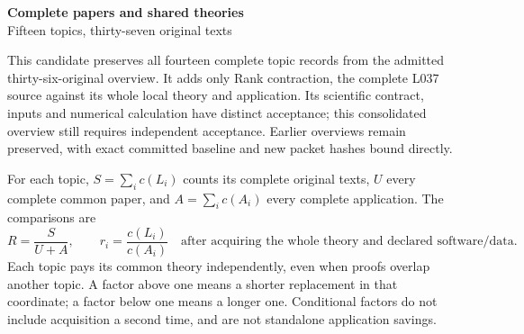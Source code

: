\documentclass[11pt,a4paper]{article}
\begin{document}
\begin{center}\Large\textbf{Complete papers and shared theories}\\[4pt]
\normalsize Fifteen topics, thirty-seven original texts\end{center}
This candidate preserves all fourteen complete topic records from the admitted thirty-six-original overview. It adds only Rank contraction, the complete L037 source against its whole local theory and application. Its scientific contract, inputs and numerical calculation have distinct acceptance; this consolidated overview still requires independent acceptance. Earlier overviews remain preserved, with exact committed baseline and new packet hashes bound directly.

For each topic, $S=\sum_i c(L_i)$ counts its complete original texts, $U$ every complete common paper, and $A=\sum_i c(A_i)$ every complete application. The comparisons are
\[
 R=\frac{S}{U+A},\qquad r_i=\frac{c(L_i)}{c(A_i)}
 \quad\text{after acquiring the whole theory and declared software/data.}
\]
Each topic pays its common theory independently, even when proofs overlap another topic. A factor above one means a shorter replacement in that coordinate; a factor below one means a longer one. Conditional factors do not include acquisition a second time, and are not standalone application savings.
\end{document}

